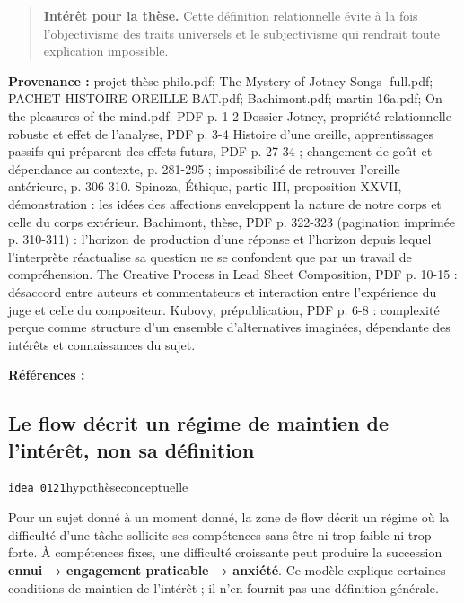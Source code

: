 \documentclass[10pt,a4paper]{article}
\begin{document}
\begin{quote}
\textbf{Intérêt pour la thèse.} Cette définition relationnelle évite à la fois l'objectivisme des traits universels et le subjectivisme qui rendrait toute explication impossible.
\end{quote}
{\footnotesize\color{metadata}\textbf{Provenance :} projet thèse philo.pdf; The Mystery of Jotney Songs -full.pdf; PACHET HISTOIRE OREILLE BAT.pdf; Bachimont.pdf; martin-16a.pdf; On the pleasures of the mind.pdf. PDF p. 1-2 Dossier Jotney, propriété relationnelle robuste et effet de l'analyse, PDF p. 3-4 Histoire d'une oreille, apprentissages passifs qui préparent des effets futurs, PDF p. 27-34 ; changement de goût et dépendance au contexte, p. 281-295 ; impossibilité de retrouver l'oreille antérieure, p. 306-310. Spinoza, Éthique, partie III, proposition XXVII, démonstration : les idées des affections enveloppent la nature de notre corps et celle du corps extérieur. Bachimont, thèse, PDF p. 322-323 (pagination imprimée p. 310-311) : l'horizon de production d'une réponse et l'horizon depuis lequel l'interprète réactualise sa question ne se confondent que par un travail de compréhension. The Creative Process in Lead Sheet Composition, PDF p. 10-15 : désaccord entre auteurs et commentateurs et interaction entre l'expérience du juge et celle du compositeur. Kubovy, prépublication, PDF p. 6-8 : complexité perçue comme structure d'un ensemble d'alternatives imaginées, dépendante des intérêts et connaissances du sujet.\par}
{\footnotesize\color{metadata}\textbf{Références :} \parencite{pachet2018oreille,spinoza1861oeuvres,bachimont1996hermeneutique,martin2016creativeprocess,kubovy1999pleasures}\par}

\subsection{Le flow décrit un régime de maintien de l'intérêt, non sa définition}
{\small\color{metadata} \texttt{idea\_0121}\quad\textbullet\quad hypothèse\quad\textbullet\quad conceptuelle\par}

Pour un sujet donné à un moment donné, la zone de flow décrit un régime où la difficulté d'une tâche sollicite ses compétences sans être ni trop faible ni trop forte. À compétences fixes, une difficulté croissante peut produire la succession \textbf{ennui → engagement praticable → anxiété}. Ce modèle explique certaines conditions de maintien de l'intérêt ; il n'en fournit pas une définition générale.
\end{document}
